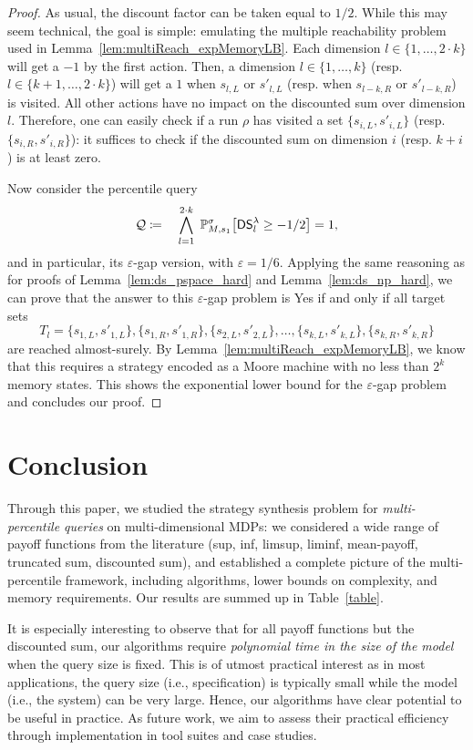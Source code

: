 \documentclass{llncs}
\newcommand{\strat}{\ensuremath{\sigma} }
\newcommand*{\pr}{\mathbb{P}}
\newcommand{\discSum}[1]{\ensuremath{{\sf DS}^{#1}} }
\newcommand{\discount}{\ensuremath{\lambda} }
\newcommand{\query}{\ensuremath{\mathcal{Q}} }
\begin{document}
\begin{proof}
As usual, the discount factor can be taken equal to $1/2$. While this may seem technical, the goal is simple: emulating the multiple reachability problem used in Lemma~\ref{lem:multiReach_expMemoryLB}. Each dimension $l \in \{1, \ldots{}, 2\cdot k\}$ will get a $-1$ by the first action. Then, a dimension $l \in \{1, \ldots{}, k\}$ (resp. $l \in \{k + 1, \ldots{}, 2\cdot k\}$) will get a $1$ when $s_{l,L}$ or $s'_{l,L}$ (resp. when $s_{l-k,R}$ or $s'_{l-k,R}$) is visited. All other actions have no impact on the discounted sum over dimension $l$. Therefore, one can easily check if a run $\rho$ has visited a set $\{s_{i,L}, s'_{i,L}\}$ (resp. $\{s_{i,R}, s'_{i,R}\}$): it suffices to check if the discounted sum on dimension $i$ (resp. $k+i$) is at least zero.

Now consider the percentile query
\begin{equation*}
\query \coloneqq \quad \bigwedge_{l = 1}^{2\cdot k}\; \pr_{M,s_{1}}^\strat\big[\discSum{\discount}_{l} \geq -1/2\big] = 1,
\end{equation*}
and in particular, its $\varepsilon$-gap version, with $\varepsilon = 1/6$. Applying the same reasoning as for proofs of Lemma~\ref{lem:ds_pspace_hard} and Lemma~\ref{lem:ds_np_hard}, we can prove that the answer to this $\varepsilon$-gap problem is \textsf{Yes} if and only if all target sets
\begin{equation*}
T_{l} = \{s_{1,L}, s'_{1,L}\}, \{s_{1,R}, s'_{1,R}\}, \{s_{2,L}, s'_{2,L}\}, \ldots{}, \{s_{k,L}, s'_{k,L}\}, \{s_{k,R}, s'_{k,R}\}
\end{equation*} 
are reached almost-surely. By Lemma~\ref{lem:multiReach_expMemoryLB}, we know that this requires a strategy encoded as a Moore machine with no less than $2^{k}$ memory states. This shows the exponential lower bound for the $\varepsilon$-gap problem and concludes our proof.
\end{proof}
 
\section{Conclusion}

Through this paper, we studied the strategy synthesis problem for \textit{multi-percentile queries} on multi-dimen\-sion\-al MDPs: we considered a wide range of payoff functions from the literature (sup, inf, limsup, liminf, mean-payoff, truncated sum, discounted sum), and established a complete picture of the multi-percentile framework, including algorithms, lower bounds on complexity, and memory requirements. Our results are summed up in Table~\ref{table}.

It is especially interesting to observe that for all payoff functions but the discounted sum, our algorithms require \textit{polynomial time in the size of the model} when the query size is fixed. This is of utmost practical interest as in most applications, the query size (i.e., specification) is typically small while the model (i.e., the system) can be very large. Hence, our algorithms have clear potential to be useful in practice. As future work, we aim to assess their practical efficiency through implementation in tool suites and case studies.



\end{document}

